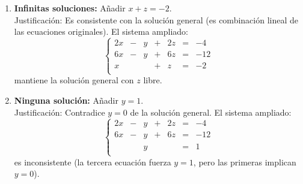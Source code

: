 \begin{prob}
\begin{myproof}
\begin{enumerate}[$a)$]
\item \textbf{Infinitas soluciones:} Añadir $\boxed{x + z = -2}$.\\
Justificación: Es consistente con la solución general (es combinación lineal de las ecuaciones originales). El sistema ampliado:
\[
\left\lbrace \begin{array}{rcrcrcl}
2x & - & y & + & 2z & = & -4 \\
6x & - & y & + & 6z & = & -12 \\
x & & & + & z & = & -2 \\
\end{array} \right.
\]
mantiene la solución general con $z$ libre.

\item \textbf{Ninguna solución:} Añadir $\boxed{y = 1}$.\\
Justificación: Contradice $y = 0$ de la solución general. El sistema ampliado:
\[
\left\lbrace \begin{array}{rcrcrcl}
2x & - & y & + & 2z & = & -4 \\
6x & - & y & + & 6z & = & -12 \\
& & y & & & = & 1 \\
\end{array} \right.
\]
es inconsistente (la tercera ecuación fuerza $y=1$, pero las primeras implican $y=0$).
\end{enumerate}
\end{myproof}
\end{prob}

